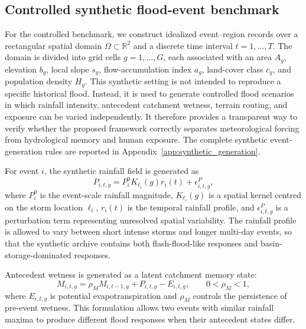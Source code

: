 \documentclass[pdflatex,sn-mathphys-ay]{sn-jnl}
\theoremstyle{thmstyleone}
\theoremstyle{thmstylethree}
\theoremstyle{thmstyletwo}
\begin{document}
\subsection{Controlled synthetic flood-event benchmark}
\label{subsec:synthetic_benchmark}

For the controlled benchmark, we construct idealized event--region
records over a rectangular spatial domain
$\Omega\subset\mathbb{R}^{2}$ and a discrete time interval
$t=1,\ldots,T$.  The domain is divided into grid cells
$g=1,\ldots,G$, each associated with an area $A_g$, elevation
$b_g$, local slope $s_g$, flow-accumulation index $a_g$, land-cover
class $c_g$, and population density $H_g$.  This synthetic setting is
not intended to reproduce a specific historical flood.  Instead, it is
used to generate controlled flood scenarios in which rainfall intensity,
antecedent catchment wetness, terrain routing, and exposure can be
varied independently.  It therefore provides a transparent way to
verify whether the proposed framework correctly separates
meteorological forcing from hydrological memory and human exposure.
The complete synthetic event-generation rules are reported in
Appendix~\ref{app:synthetic_generation}.

For event $i$, the synthetic rainfall field is generated as
\begin{equation}
  P_{i,t,g}
  =
  P^{0}_{i}
  K_{\ell_i}
  \left(
    g
  \right)
  r_i(t)
  +
  \epsilon^{P}_{i,t,g},
  \label{eq:synthetic_precip}
\end{equation}
where $P^{0}_{i}$ is the event-scale rainfall magnitude,
$K_{\ell_i}(g)$ is a spatial kernel centred on the storm location
$\ell_i$, $r_i(t)$ is the temporal rainfall profile, and
$\epsilon^{P}_{i,t,g}$ is a perturbation term representing unresolved
spatial variability.  The rainfall profile is allowed to vary between
short intense storms and longer multi-day events, so that the synthetic
archive contains both flash-flood-like responses and
basin-storage-dominated responses.

Antecedent wetness is generated as a latent catchment memory state:
\begin{equation}
  M_{i,t,g}
  =
  \rho_M M_{i,t-1,g}
  +
  P_{i,t,g}
  -
  E_{i,t,g},
  \qquad
  0<\rho_M<1,
  \label{eq:synthetic_memory}
\end{equation}
where $E_{i,t,g}$ is potential evapotranspiration and $\rho_M$
controls the persistence of pre-event wetness.  This formulation allows
two events with similar rainfall maxima to produce different flood
responses when their antecedent states differ.
\end{document}
